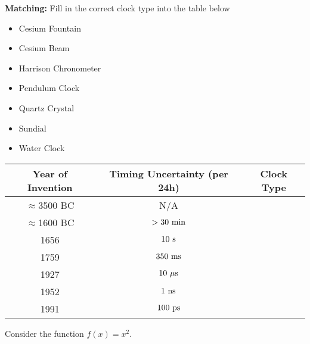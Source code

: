 \documentclass[11pt]{exam}
\newcommand{\unit}[1]{\ \textnormal{#1}}
\begin{document}
\begin{questions}

\addpoints
\question[7]\textbf{Matching:} Fill in the correct clock type into the table below
\begin{itemize}
\item Cesium Fountain
\item Cesium Beam
\item Harrison Chronometer
\item Pendulum Clock
\item Quartz Crystal
\item Sundial
\item Water Clock
\end{itemize}


\large
\begin{tabular}{|c|c|c|}
\hline
Year of Invention     &Timing Uncertainty (per 24h)      &Clock Type\\
\hline
$\approx$3500 BC      &N/A                               &\hspace*{3in}\\
\hline
$\approx$1600 BC      &$>30\unit{min}$                   &\hspace*{3in}\\
\hline
1656                  &$10\unit{s}$                      &\hspace*{3in}\\
\hline
1759                  &$350\unit{ms}$                    &\hspace*{3in}\\
\hline
1927                  &$10\unit{$\mu$s}$                  &\hspace*{3in}\\
\hline
1952                  &$1\unit{ns}$                      &\hspace*{3in}\\
\hline
1991                  &$100\unit{ps}$                    &\hspace*{3in}\\
\hline
\end{tabular} 


\addpoints
\question Consider the function $f(x)=x^2$.


\end{questions}
\end{document}
